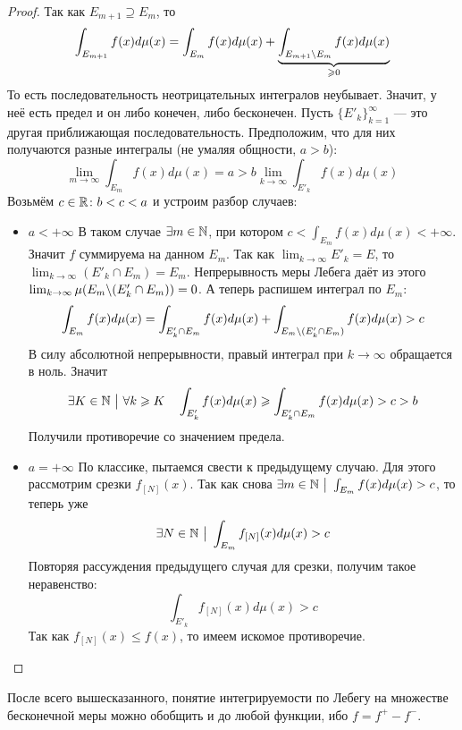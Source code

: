 \begin{proof}
	Так как $E_{m + 1} \supseteq E_m$, то
	\[
		\int_{E_{m + 1}} f(x)d\mu(x) = \int_{E_m} f(x)d\mu(x) + \underbrace{\int_{E_{m + 1} \backslash E_m} f(x)d\mu(x)}_{\geqslant 0}
	\]
	То есть последовательность неотрицательных интегралов неубывает. Значит, у неё есть предел и он либо конечен, либо бесконечен. Пусть $\{E'_k\}_{k = 1}^\infty$ --- это другая приближающая последовательность. Предположим, что для них получаются разные интегралы (не умаляя общности, $a > b$):
	\[
		\lim_{m \to \infty} \int_{E_m} f(x)d\mu(x) = a > b \lim_{k \to \infty} \int_{E'_k} f(x)d\mu(x)
	\]
	Возьмём $c \in \mathbb{R} \colon b < c < a$ и устроим разбор случаев:
	\begin{itemize}
		\item $a < +\infty$ В таком случае $\exists m \in \mathbb{N}$, при котором $c < \int_{E_m} f(x)d\mu(x) < +\infty$. Значит $f$ суммируема на данном $E_m$. Так как $\lim_{k \to \infty} E'_k = E$, то $\lim_{k \to \infty} (E'_k \cap E_m) = E_m$. Непрерывность меры Лебега даёт из этого $\lim_{k \to \infty} \mu(E_m \backslash (E'_k \cap E_m)) = 0$. А теперь распишем интеграл по $E_m$:
		\[
			\int_{E_m} f(x)d\mu(x) = \int_{E'_k \cap E_m} f(x)d\mu(x) + \int_{E_m \backslash (E'_k \cap E_m)} f(x)d\mu(x) > c
		\]
		В силу абсолютной непрерывности, правый интеграл при $k \to \infty$ обращается в ноль. Значит
		\[
			\exists K \in \mathbb{N} \ \big|\  \forall k \geqslant K \quad \int_{E'_k} f(x)d\mu(x) \geqslant \int_{E'_k \cap E_m} f(x)d\mu(x) > c > b
		\]
		Получили противоречие со значением предела.
		
		\item $a = +\infty$ По классике, пытаемся свести к предыдущему случаю. Для этого рассмотрим срезки $f_{[N]}(x)$. Так как снова $\exists m \in \mathbb{N} \ \big|\  \int_{E_m} f(x)d\mu(x) > c$, то теперь уже
		\[
			\exists N \in \mathbb{N} \ \big|\  \int_{E_m} f_{[N]}(x)d\mu(x) > c
		\]
		Повторяя рассуждения предыдущего случая для срезки, получим такое неравенство:
		\[
			\int_{E'_k} f_{[N]}(x)d\mu(x) > c
		\]
		Так как $f_{[N]}(x) \le f(x)$, то имеем искомое противоречие.
	\end{itemize}
\end{proof}

\begin{note}
	После всего вышесказанного, понятие интегрируемости по Лебегу на множестве бесконечной меры можно обобщить и до любой функции, ибо $f = f^+ - f^-$.
\end{note}